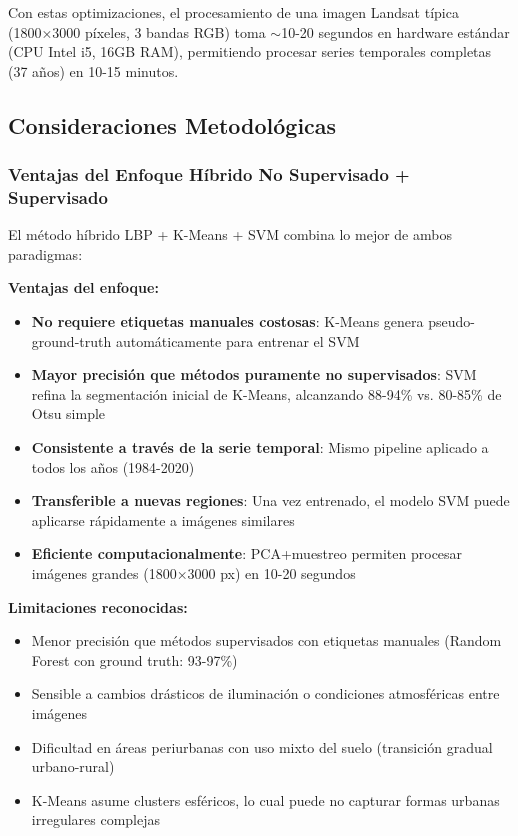 Con estas optimizaciones, el procesamiento de una imagen Landsat típica (1800×3000 píxeles, 3 bandas RGB) toma $\sim$10-20 segundos en hardware estándar (CPU Intel i5, 16GB RAM), permitiendo procesar series temporales completas (37 años) en 10-15 minutos.

\subsection{Consideraciones Metodológicas}

\subsubsection{Ventajas del Enfoque Híbrido No Supervisado + Supervisado}

El método híbrido LBP + K-Means + SVM combina lo mejor de ambos paradigmas:

\textbf{Ventajas del enfoque:}
\begin{itemize}[itemsep=2pt]
	\item \textbf{No requiere etiquetas manuales costosas}: K-Means genera pseudo-ground-truth automáticamente para entrenar el SVM
	\item \textbf{Mayor precisión que métodos puramente no supervisados}: SVM refina la segmentación inicial de K-Means, alcanzando 88-94\% vs. 80-85\% de Otsu simple
	\item \textbf{Consistente a través de la serie temporal}: Mismo pipeline aplicado a todos los años (1984-2020)
	\item \textbf{Transferible a nuevas regiones}: Una vez entrenado, el modelo SVM puede aplicarse rápidamente a imágenes similares
	\item \textbf{Eficiente computacionalmente}: PCA+muestreo permiten procesar imágenes grandes (1800×3000 px) en 10-20 segundos
\end{itemize}

\textbf{Limitaciones reconocidas:}
\begin{itemize}[itemsep=2pt]
	\item Menor precisión que métodos supervisados con etiquetas manuales (Random Forest con ground truth: 93-97\%)
	\item Sensible a cambios drásticos de iluminación o condiciones atmosféricas entre imágenes
	\item Dificultad en áreas periurbanas con uso mixto del suelo (transición gradual urbano-rural)
	\item K-Means asume clusters esféricos, lo cual puede no capturar formas urbanas irregulares complejas
\end{itemize}

